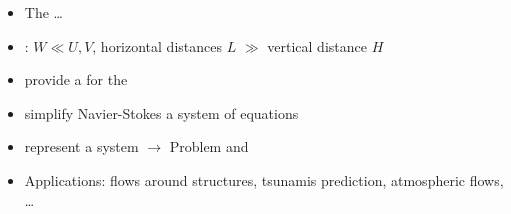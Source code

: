 %

\begin{frame}
\begin{itemize}
\setlength\itemsep{2em}
\item<1->[] The \textbf{} \dots
\item<2-> :  $ W \ll U,V $, horizontal distances $L$ $\gg$ vertical distance $H$
\item<3-> provide a  for the 
\item<4-> simplify  Navier-Stokes  a  system of equations
\item<5-> represent a  system $\rightarrow$  Problem and 
\item<6-> Applications: {\small {} flows around structures, tsunamis prediction, atmospheric flows, \dots}
\end{itemize}
\end{frame}
\clearpage



